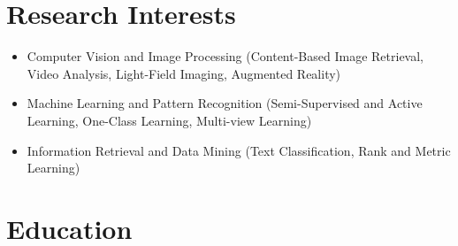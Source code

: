\documentclass[a4paper]{article}
\theoremstyle{definition}
\begin{document}
\section{Research Interests}
\begin{itemize}
\item { Computer Vision and Image Processing} (Content-Based Image Retrieval, Video Analysis, Light-Field Imaging, Augmented Reality)
\item { Machine Learning and Pattern Recognition} (Semi-Supervised and Active Learning, One-Class Learning, Multi-view Learning)
\item { Information Retrieval and Data Mining} (Text Classification, Rank and Metric Learning)
\end{itemize}


\section{Education}
\end{document}
